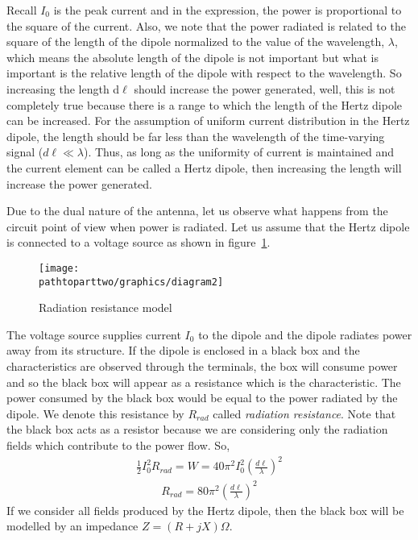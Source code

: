 Recall $I_0$ is the peak current and in the expression, the power is proportional to the square of the current. Also, we note that the power radiated is related to the square of the length of the dipole normalized to the value of the wavelength, $\lambda$, which means the absolute length of the dipole is not important but what is important is the relative length of the dipole with respect to the wavelength. So increasing the length d$\ell$ should increase the power generated, well, this is not completely true because there is a range to which the length of the Hertz dipole can be increased. For the assumption of uniform current distribution in the Hertz dipole, the length should be far less than the wavelength of the time-varying signal ($d\ell \ll \lambda$). Thus, as long as the uniformity of current is maintained and the current element can be called a Hertz dipole, then increasing the length will increase the power generated. 

Due to the dual nature of the antenna, let us observe what happens from the circuit point of view when power is radiated. Let us assume that the Hertz dipole is connected to a voltage source as shown in figure~\ref{fig:radresistantmodel}.
\begin{figure}[h]
\centering
\texttt{[image: \\pathtoparttwo/graphics/diagram2]}
\caption{Radiation resistance model}
\label{fig:radresistantmodel}
\end{figure}

The voltage source supplies current $I_0$ to the dipole and the dipole radiates power away from its structure. If the dipole is enclosed in a black box and the characteristics are observed through the terminals, the box will consume power and so the black box will appear as a resistance which is the characteristic. The power consumed by the black box would be equal to the power radiated by the dipole. We denote this resistance by $R_{rad}$ called \emph{radiation resistance}. Note that the black box acts as a resistor because we are considering only the radiation fields which contribute to the power flow. So,
\begin{align*}
\frac{1}{2}I_0^2R_{rad} = W = 40\pi^2I_0^2\left(\frac{d\ell}{\lambda}\right)^2
\end{align*}
\begin{align}
R_{rad} = 80\pi^2\left(\frac{d\ell}{\lambda}\right)^2
\label{eqn:radresistance}
\end{align}
If we consider all fields produced by the Hertz dipole, then the black box will be modelled by an impedance $Z = (R + jX)\Omega$. 

